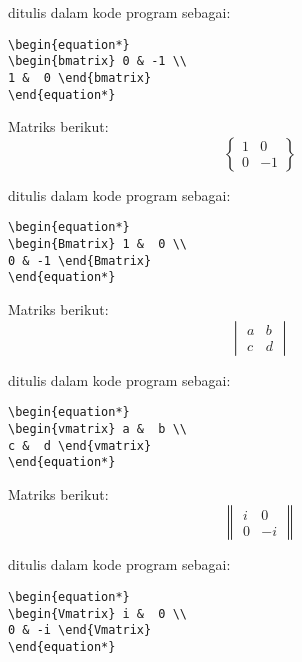 \noindent ditulis dalam kode program sebagai:
\begin{verbatim}
\begin{equation*}
\begin{bmatrix} 0 & -1 \\ 
1 &  0 \end{bmatrix}
\end{equation*}
\end{verbatim}

\noindent Matriks berikut:
\begin{equation*}
\begin{Bmatrix} 1 &  0 \\ 
0 & -1 \end{Bmatrix}
\end{equation*}

\noindent ditulis dalam kode program sebagai:
\begin{verbatim}
\begin{equation*}
\begin{Bmatrix} 1 &  0 \\ 
0 & -1 \end{Bmatrix}
\end{equation*}\end{verbatim}

\noindent Matriks berikut:
\begin{equation*}
\begin{vmatrix} a &  b \\ 
c &  d \end{vmatrix}
\end{equation*}

\noindent ditulis dalam kode program sebagai:
\begin{verbatim}
\begin{equation*}
\begin{vmatrix} a &  b \\ 
c &  d \end{vmatrix}
\end{equation*}\end{verbatim}

\noindent Matriks berikut:
\begin{equation*}
\begin{Vmatrix} i &  0 \\ 
0 & -i \end{Vmatrix}
\end{equation*}

\noindent ditulis dalam kode program sebagai:
\begin{verbatim}
\begin{equation*}
\begin{Vmatrix} i &  0 \\ 
0 & -i \end{Vmatrix}
\end{equation*}\end{verbatim}
